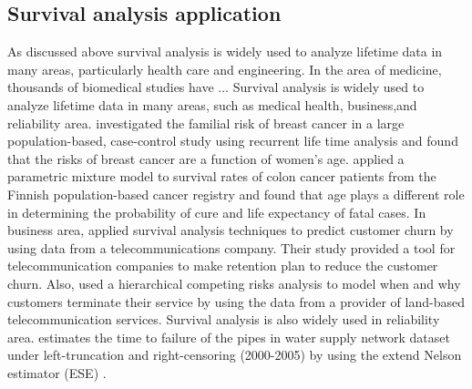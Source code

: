 \documentclass[12pt,letterpaper]{article}
\begin{document}
\subsection{Survival analysis application}
As discussed above survival analysis is widely used to analyze lifetime data in many areas, particularly health care and engineering.  In the area of medicine, thousands of biomedical studies have ...
Survival analysis is widely used to analyze lifetime data in many areas, such as medical health, business,and reliability area.
\citet{claus1991} investigated the familial risk of breast cancer in a large population-based, case-control study using recurrent life time analysis and found that the risks of breast cancer are a function of women's age. 
\citet{de1999} applied a parametric mixture model to survival rates of colon cancer patients from the Finnish population-based  cancer registry and found that age plays a different role in determining the probability of cure and life expectancy of fatal cases. 
In business area, \citet{lu2002} applied survival analysis techniques to predict customer churn by using data from a telecommunications company. Their study provided a tool for telecommunication companies to make retention plan to reduce the customer churn. 
Also, \citet{braun2011} used a hierarchical competing risks analysis to model when and why customers terminate their service by using the data from a provider of land-based telecommunication services. %
Survival analysis is also widely used in reliability area. \citet{carrion2010} estimates the time to failure of the pipes in water supply network dataset under left-truncation and right-censoring (2000-2005) by using the extend Nelson estimator (ESE) \citep{pan1998}. %
\end{document}
